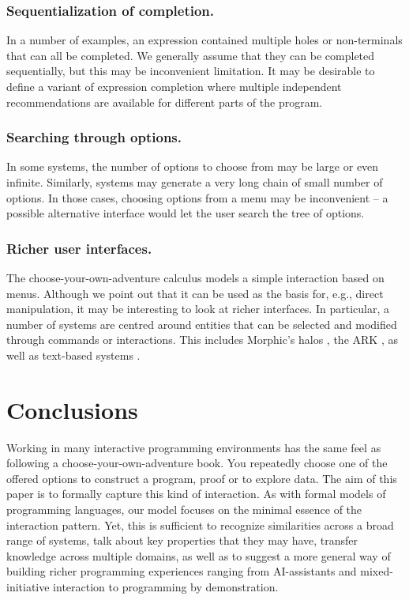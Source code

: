 \documentclass[nonacm,anonymous,sigplan,screen]{acmart}
\begin{document}
\subsubsection*{Sequentialization of completion.}
In a number of examples, an expression contained multiple holes or non-terminals that can
all be completed. We generally assume that they
can be completed sequentially, but this may be inconvenient limitation. It may be desirable to
define a variant of expression completion where multiple independent recommendations are
available for different parts of the program.

\subsubsection*{Searching through options.}
In some systems, the number of options to choose from may be large or even infinite.
Similarly, systems may generate a very long chain of small number of options. In those cases,
choosing options from a menu may be inconvenient -- a possible alternative interface would let the
user search the tree of options.

\subsubsection*{Richer user interfaces.}
The choose-your-own-adventure calculus models a simple interaction based on menus. Although
we point out that it can be used as the basis for, e.g., direct manipulation,
it may be interesting to look at richer interfaces.
In particular, a number of systems are centred around entities that can be selected and
modified through commands or interactions. This includes Morphic's halos
\cite{maloney-1995-morphic,maloney-2001-morphic}, the ARK \cite{smith-1986-ark},
as well as text-based systems \cite{camarena-2025-embark}.

\section{Conclusions}
Working in many interactive programming environments has the same feel as following a
choose-your-own-adventure book. You repeatedly choose one of the offered options to
construct a program, proof or to explore data. The aim of this paper is to formally capture
this kind of interaction. As with formal models of programming languages, our model focuses on
the minimal essence of the interaction pattern. Yet, this is sufficient to recognize similarities
across a broad range of systems, talk about key properties that they may have, transfer knowledge
across multiple domains, as well as to suggest a more general way of building richer programming
experiences ranging from AI-assistants and mixed-initiative interaction to programming by demonstration.



\end{document}
